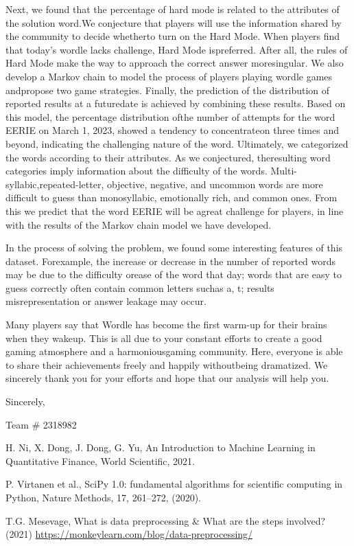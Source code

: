 \documentclass[12pt]{article}  %
\begin{document}
 \noindent Next, we found that the percentage of hard mode is related to the attributes of the solution word.We conjecture that players will use the information shared by the community to decide whetherto turn on the Hard Mode. When players find that today’s wordle lacks challenge, Hard Mode ispreferred. After all, the rules of Hard Mode make the way to approach the correct answer moresingular.
 We also develop a Markov chain to model the process of players playing wordle games andpropose two game strategies. Finally, the prediction of the distribution of reported results at a futuredate is achieved by combining these results. Based on this model, the percentage distribution ofthe number of attempts for the word EERIE on March 1, 2023, showed a tendency to concentrateon three times and beyond, indicating the challenging nature of the word.
 \noindent Ultimately, we categorized the words according to their attributes. As we conjectured, theresulting word categories imply information about the difficulty of the words. Multi-syllabic,repeated-letter, objective, negative, and uncommon words are more difficult to guess than monosyllabic, emotionally rich, and common ones. From this we predict that the word EERIE will be agreat challenge for players, in line with the results of the Markov chain model we have developed.
 
 \noindent In the process of solving the problem, we found some interesting features of this dataset. Forexample, the increase or decrease in the number of reported words may be due to the difficulty orease of the word that day; words that are easy to guess correctly often contain common letters suchas a, t; results misrepresentation or answer leakage may occur.
 
 \noindent Many players say that Wordle has become the first warm-up for their brains when they wakeup. This is all due to your constant efforts to create a good gaming atmosphere and a harmoniousgaming community. Here, everyone is able to share their achievements freely and happily withoutbeing dramatized. We sincerely thank you for your efforts and hope that our analysis will help you.
 
 \hfill Sincerely,
 
 \hfill Team \# 2318982
 
 \clearpage   %
 
 \begin{thebibliography}{99}
     
   H. Ni, X. Dong, J. Dong, G. Yu, An Introduction to Machine Learning in Quantitative Finance, World Scientific, 2021.
   
   P. Virtanen et al., SciPy 1.0: fundamental algorithms for scientific computing in
   Python, Nature Methods, 17, 261--272, (2020).
   
   T.G. Mesevage, What is data preprocessing \& What are the steps involved? (2021) \href{https://monkeylearn.com/blog/data-preprocessing/}{https://monkeylearn.com/blog/data-preprocessing/}
 \end{thebibliography}
 
 
 
\end{document}
